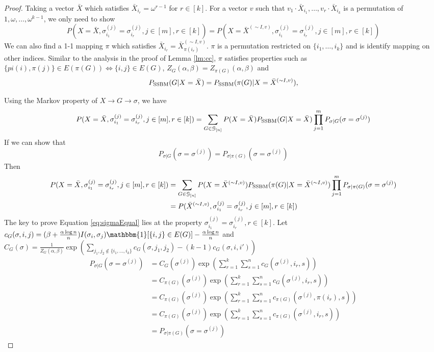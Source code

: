 \documentclass{article}
\begin{document}
\begin{proof}
Taking a vector $\bar{X}$ which satisfies $\bar{X}_{i_r} = \omega^{r-1}$ for $r\in [k]$. For a vector $v$ such that $v_{1}\cdot \bar{X}_{i_1}, \dots, v_{r} \cdot \bar{X}_{i_k}$ is a permutation of $1, \omega, \dots, \omega^{k-1}$, we only need to show
\begin{equation}\label{eq:11}
P(X=\bar{X}, \sigma_{i_1}^{(j)}=\sigma_{i_r}^{(j)}, j\in[m], r\in[k]) = P(X=\bar{X}^{(\sim I, v)}, \sigma_{i_1}^{(j)}=\sigma_{i_r}^{(j)}, j\in[m], r\in[k])
\end{equation}
We can also find a 1-1 mapping $\pi$ which satisfies $ \bar{X}_{i_r} = \bar{X}^{(\sim I, v)}_{\pi(i_r)}$. $\pi$ is a permutation restricted on $\{i_1, \dots, i_k\}$ and is identify mapping on other indices.
Similar to the analysis in the proof of Lemma \ref{lm:cc}, $\pi$ satisfies properties such as
$\{pi(i), \pi(j)\} \in E(\pi(G)) \iff \{i,j\} \in E(G)$, $Z_G(\alpha, \beta) = Z_{\pi(G)}(\alpha, \beta)$ and
$$
P_{\operatorname{SSBM}}(G  | X = \bar{X})=P_{\operatorname{SSBM}}(\pi(G) | X = \bar{X}^{(\sim I,v)}),
$$

Using the Markov property of $X \to G \to \sigma$, we have
\begin{align*}
P(X=\bar{X}, \sigma_{i_1}^{(j)}=\sigma_{i_r}^{(j)}, j\in[m], r\in[k])& = \sum_{G \in \mathcal{G}_{[n]}} P(X=\bar{X}) P_{\operatorname{SSBM}}(G  | X = \bar{X})\prod_{j=1}^m P_{\sigma | G}(\sigma =\sigma^{(j)})\\
\end{align*}
If we can show that 
\begin{equation}\label{eq:sigmaEqual}
P_{\sigma | G}(\sigma =\sigma^{(j)}) = P_{\sigma | \pi(G)}(\sigma =\sigma^{(j)})
\end{equation}
Then 
\begin{align*}
P(X=\bar{X}, \sigma_{i_1}^{(j)}=\sigma_{i_r}^{(j)}, j\in[m], r\in[k]) &
= \sum_{G \in \mathcal{G}_{[n]}} P(X=\bar{X}^{(\sim I,v)})
P_{\operatorname{SSBM}}(\pi(G)  | X = \bar{X}^{(\sim I,v)})\prod_{j=1}^m P_{\sigma | \pi(G)}(\sigma =\sigma^{(j)})\\
& = P(\bar{X}^{(\sim I,v)}, \sigma_{i_1}^{(j)}=\sigma_{i_r}^{(j)}, j\in[m], r\in[k])
\end{align*}
The key to prove Equation \eqref{eq:sigmaEqual} lies at the property $\sigma^{(j)}_{i_1} = \sigma^{(j)}_{i_r}, r\in [k]$.
Let $c_G(\sigma, i,j) = (\beta + \frac{\alpha \log n}{n})I(\sigma_i,\sigma_j) \mathbbm{1}[\{i,j\}\in E(G)]  - \frac{\alpha \log n}{n}$
and $C_G(\sigma) = \frac{1}{Z_G(\alpha, \beta)}\exp(\sum_{j_1, j_2 \not\in \{i_1, \dots, i_k\}} c_G(\sigma, j_1, j_2) - (k-1)c_G(\sigma, i,i'))$
\begin{align*}
P_{\sigma | G}(\sigma =\sigma^{(j)}) & = C_G(\sigma^{(j)})\exp(\sum_{r=1}^k\sum_{s=1}^n c_G(\sigma^{(j)}, i_r, s)) \\
& = C_{\pi(G)}(\sigma^{(j)})\exp(\sum_{r=1}^k\sum_{s=1}^n c_G(\sigma^{(j)}, i_r, s) ) \\
& = C_{\pi(G)}(\sigma^{(j)})\exp(\sum_{r=1}^k\sum_{s=1}^n c_{\pi(G)}(\sigma^{(j)}, \pi(i_r), s) ) \\
& = C_{\pi(G)}(\sigma^{(j)})\exp(\sum_{r=1}^k\sum_{s=1}^n c_{\pi(G)}(\sigma^{(j)}, i_r, s) ) \\
& = P_{\sigma | \pi(G)}(\sigma =\sigma^{(j)})
\end{align*}
\end{proof}
\end{document}
